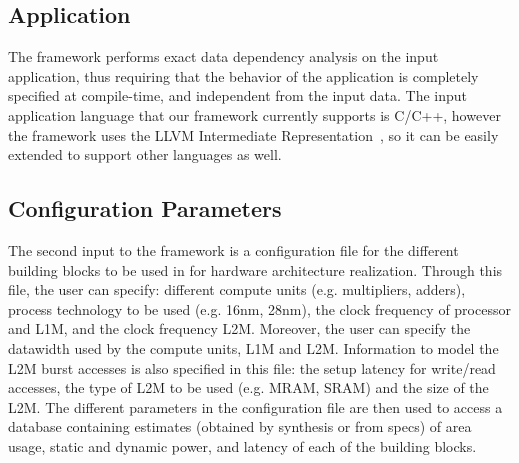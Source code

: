 \subsection{Application}
\label{ssec:app}
The framework performs exact data dependency analysis on the input application, thus requiring that the behavior of the application is completely specified at compile-time, and independent from the input data. The input application language that our framework currently supports is C/C++, however the framework uses the LLVM Intermediate Representation~\cite{llvm}, so it can be easily extended to support other languages as well.

\subsection{Configuration Parameters}
\label{ssec:conf_param}
The second input to the framework is a configuration file for the different building blocks to be used in for hardware architecture realization. Through this file, the user can specify: different compute units (e.g. multipliers, adders), process technology to be used (e.g. 16nm, 28nm), the clock frequency of processor and L1M, and the clock frequency L2M. Moreover, the user can specify the datawidth used by the compute units, L1M and L2M. 
Information to model the L2M burst accesses is also specified in this file: the setup latency for write/read accesses, the type of L2M to be used (e.g. MRAM, SRAM) and the size of the L2M. The different parameters in the configuration file are then used to access a database containing estimates (obtained by synthesis or from specs) of area usage, static and dynamic power, and latency of each of the building blocks.

%


